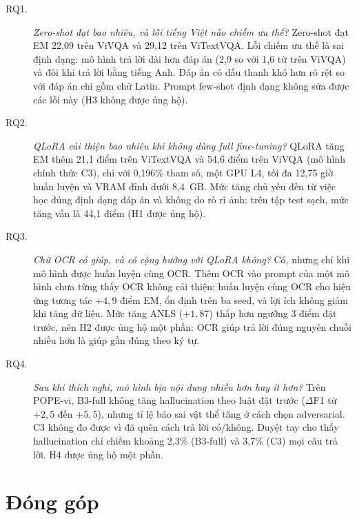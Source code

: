\begin{description}
  \item[RQ1.] \textit{Zero-shot đạt bao nhiêu, và lỗi tiếng Việt nào chiếm ưu thế?}
  Zero-shot đạt EM 22,09 trên ViVQA và 29,12 trên ViTextVQA. Lỗi chiếm ưu thế là
  sai định dạng: mô hình trả lời dài hơn đáp án (2,9 so với 1,6 từ trên ViVQA) và
  đôi khi trả lời bằng tiếng Anh. Đáp án có dấu thanh khó hơn rõ rệt so với đáp
  án chỉ gồm chữ Latin. Prompt few-shot định dạng không sửa được các lỗi này
  (H3 không được ủng hộ).

  \item[RQ2.] \textit{QLoRA cải thiện bao nhiêu khi không dùng full fine-tuning?}
  QLoRA tăng EM thêm 21,1 điểm trên ViTextVQA và 54,6 điểm trên ViVQA (mô hình
  chính thức C3), chỉ với 0,196\% tham số, một GPU L4, tối đa 12,75 giờ huấn luyện
  và VRAM đỉnh dưới 8,4~GB. Mức tăng chủ yếu đến từ việc học đúng định dạng đáp án
  và không do rò rỉ ảnh: trên tập test sạch, mức tăng vẫn là 44,1 điểm (H1 được
  ủng hộ).

  \item[RQ3.] \textit{Chữ OCR có giúp, và có cộng hưởng với QLoRA không?}
  Có, nhưng chỉ khi mô hình được huấn luyện cùng OCR. Thêm OCR vào prompt của một
  mô hình chưa từng thấy OCR không cải thiện; huấn luyện cùng OCR cho hiệu ứng tương
  tác $+4{,}9$ điểm EM, ổn định trên ba seed, và lợi ích không giảm khi tăng dữ
  liệu. Mức tăng ANLS ($+1{,}87$) thấp hơn ngưỡng 3 điểm đặt trước, nên H2 được
  ủng hộ một phần: OCR giúp trả lời đúng nguyên chuỗi nhiều hơn là giúp gần đúng
  theo ký tự.

  \item[RQ4.] \textit{Sau khi thích nghi, mô hình bịa nội dung nhiều hơn hay ít hơn?}
  Trên POPE-vi, B3-full không tăng hallucination theo luật đặt trước ($\Delta$F1
  từ $+2{,}5$ đến $+5{,}5$), nhưng tỉ lệ báo sai vật thể tăng ở cách chọn
  adversarial. C3 không đo được vì đã quên cách trả lời có/không. Duyệt tay cho
  thấy hallucination chỉ chiếm khoảng 2,3\% (B3-full) và 3,7\% (C3) mọi câu trả
  lời. H4 được ủng hộ một phần.
\end{description}

\section{Đóng góp}
\label{sec:con-contrib}

